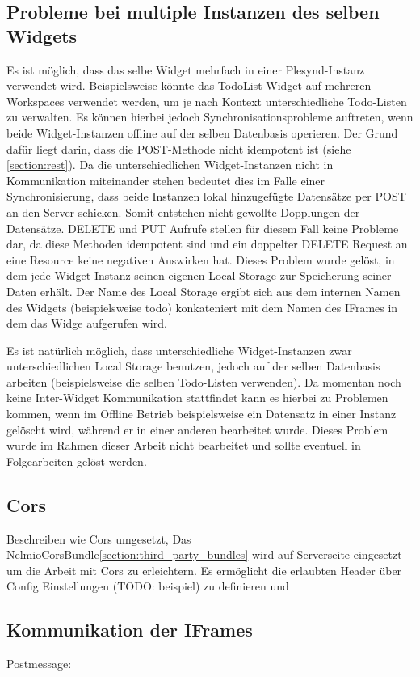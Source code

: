\subsection{Probleme bei multiple Instanzen des selben Widgets}
Es ist möglich, dass das selbe Widget mehrfach in einer Plesynd-Instanz verwendet wird. Beispielsweise könnte das TodoList-Widget auf mehreren Workspaces verwendet werden, um je nach Kontext unterschiedliche Todo-Listen zu verwalten. Es können hierbei jedoch Synchronisationsprobleme auftreten, wenn beide Widget-Instanzen offline auf der selben Datenbasis operieren. Der Grund dafür liegt darin, dass die POST-Methode nicht idempotent ist (siehe \ref{section:rest}). Da die unterschiedlichen Widget-Instanzen nicht in Kommunikation miteinander stehen bedeutet dies im Falle einer Synchronisierung, dass beide Instanzen lokal hinzugefügte Datensätze per POST an den Server schicken. Somit entstehen nicht gewollte Dopplungen der Datensätze. DELETE und PUT Aufrufe stellen für diesem Fall keine Probleme dar, da diese Methoden idempotent sind und ein doppelter DELETE Request an eine Resource keine negativen Auswirken hat. Dieses Problem wurde gelöst, in dem jede Widget-Instanz seinen eigenen Local-Storage zur Speicherung seiner Daten erhält. Der Name des Local Storage ergibt sich aus dem internen Namen des Widgets (beispielsweise todo) konkateniert mit dem Namen des IFrames in dem das Widge aufgerufen wird.

Es ist natürlich möglich, dass unterschiedliche Widget-Instanzen zwar unterschiedlichen Local Storage benutzen, jedoch auf der selben Datenbasis arbeiten (beispielsweise die selben Todo-Listen verwenden). Da momentan noch keine Inter-Widget Kommunikation stattfindet kann es hierbei zu Problemen kommen, wenn im Offline Betrieb beispielsweise ein Datensatz in einer Instanz gelöscht wird, während er in einer anderen bearbeitet wurde. Dieses Problem wurde im Rahmen dieser Arbeit nicht bearbeitet und sollte eventuell in Folgearbeiten gelöst werden.

\subsection{Cors}

Beschreiben wie Cors umgesetzt, Das NelmioCorsBundle\ref{section:third_party_bundles} wird auf Serverseite eingesetzt um die Arbeit mit Cors zu erleichtern. Es ermöglicht die erlaubten Header über Config Einstellungen (TODO: beispiel) zu definieren und 

\subsection{Kommunikation der IFrames}

Postmessage: 


